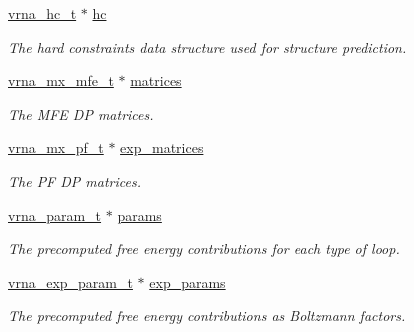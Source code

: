 \begin{Indent}
\begin{DoxyCompactItemize}
\hyperlink{group__hard__constraints_gac7e4c4f8abe3163a68110c5bff24e01d}{vrna\+\_\+hc\+\_\+t} $\ast$ \hyperlink{group__fold__compound_aceaa904dbf50092d403ca99422e8f824}{hc}
\begin{DoxyCompactList}\small\item\em The hard constraints data structure used for structure prediction. \end{DoxyCompactList}\item 
\mbox{\label{group__fold__compound_aca8be7bdc65bafe2172c6ee777f18568}} 
\hyperlink{group__dp__matrices_gae5aef35d016475e758f619b7bcb534f9}{vrna\+\_\+mx\+\_\+mfe\+\_\+t} $\ast$ \hyperlink{group__fold__compound_aca8be7bdc65bafe2172c6ee777f18568}{matrices}
\begin{DoxyCompactList}\small\item\em The M\+FE DP matrices. \end{DoxyCompactList}\item 
\mbox{\label{group__fold__compound_afc38ed5a1028a2712d2365274bf49727}} 
\hyperlink{group__dp__matrices_ga68729ab3fed26bdd1806fa814f172fc1}{vrna\+\_\+mx\+\_\+pf\+\_\+t} $\ast$ \hyperlink{group__fold__compound_afc38ed5a1028a2712d2365274bf49727}{exp\+\_\+matrices}
\begin{DoxyCompactList}\small\item\em The PF DP matrices. \end{DoxyCompactList}\item 
\mbox{\label{group__fold__compound_a19b8720c2c5321c1b97c830bd17566ea}} 
\hyperlink{group__energy__parameters_ga8a69ca7d787e4fd6079914f5343a1f35}{vrna\+\_\+param\+\_\+t} $\ast$ \hyperlink{group__fold__compound_a19b8720c2c5321c1b97c830bd17566ea}{params}
\begin{DoxyCompactList}\small\item\em The precomputed free energy contributions for each type of loop. \end{DoxyCompactList}\item 
\mbox{\label{group__fold__compound_a7052a5d24f6091b9c5f79edcc9456a12}} 
\hyperlink{group__energy__parameters_ga01d8b92fe734df8d79a6169482c7d8d8}{vrna\+\_\+exp\+\_\+param\+\_\+t} $\ast$ \hyperlink{group__fold__compound_a7052a5d24f6091b9c5f79edcc9456a12}{exp\+\_\+params}
\begin{DoxyCompactList}\small\item\em The precomputed free energy contributions as Boltzmann factors. \end{DoxyCompactList}\item 

\end{DoxyCompactItemize}
\end{Indent}
